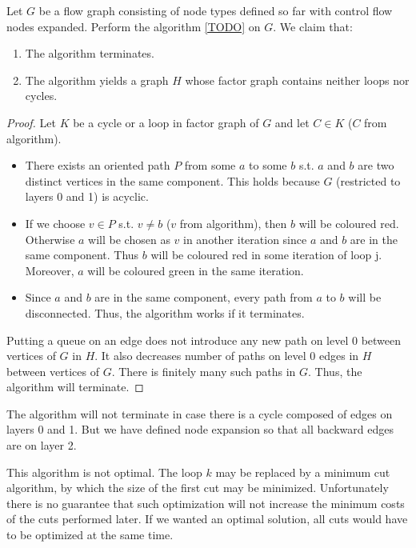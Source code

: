 \begin{claim}
  Let $G$ be a flow graph consisting of node types defined so far with control flow nodes expanded. Perform the algorithm \ref{TODO} on $G$. We claim that:
  \begin{enumerate}
    \item The algorithm terminates.
    \item The algorithm yields a graph $H$ whose factor graph contains neither loops nor cycles.
  \end{enumerate}
  \begin{proof}
    Let $K$ be a cycle or a loop in factor graph of $G$ and let $C \in K$ ($C$ from algorithm).
    \begin{itemize}
      \item There exists an oriented path $P$ from some $a$ to some $b$ s.t. $a$ and $b$ are two distinct vertices in the same component. This holds because $G$ (restricted to layers 0 and 1) is acyclic.
      \item If we choose $v \in P$ s.t. $v \neq b$ ($v$ from algorithm), then $b$ will be coloured red. Otherwise $a$ will be chosen as $v$ in another iteration since $a$ and $b$ are in the same component. Thus $b$ will be coloured red in some iteration of loop j.  Moreover, $a$ will be coloured green in the same iteration.
      \item Since $a$ and $b$ are in the same component, every path from $a$ to $b$ will be disconnected. Thus, the algorithm works if it terminates. 
    \end{itemize}
      Putting a queue on an edge does not introduce any new path on level 0 between vertices of $G$ in $H$. It also decreases number of paths on level 0 edges in $H$ between vertices of $G$. There is finitely many such paths in $G$. Thus, the algorithm will terminate.
  \end{proof}
\end{claim}

\begin{rem}
  The algorithm will not terminate in case there is a cycle composed of edges on layers 0 and 1. But we have defined node expansion so that all backward edges are on layer 2.
\end{rem}

This algorithm is not optimal. The loop $k$ may be replaced by a minimum cut algorithm, by which the size of the first cut may be minimized. Unfortunately there is no guarantee that such optimization will not increase the minimum costs of the cuts performed later. If we wanted an optimal solution, all cuts would have to be optimized at the same time. 


